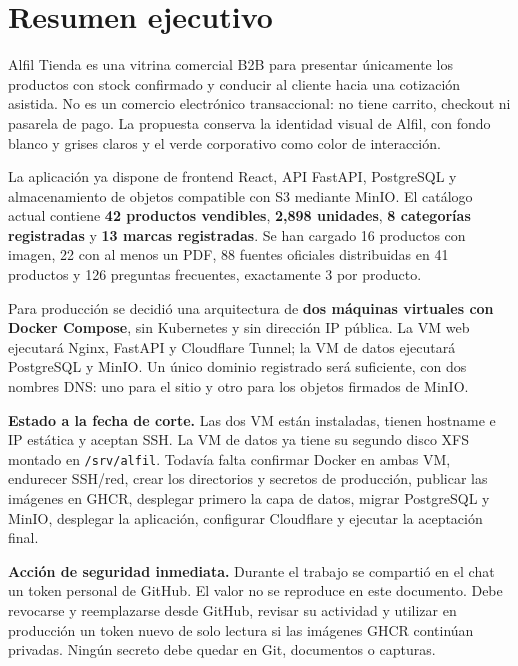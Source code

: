 \documentclass[11pt,a4paper]{article}
\newcommand{\code}[1]{\nolinkurl{#1}}
\begin{document}
\tableofcontents
\clearpage

\section{Resumen ejecutivo}

Alfil Tienda es una vitrina comercial B2B para presentar únicamente los productos con stock confirmado y conducir al cliente hacia una cotización asistida. No es un comercio electrónico transaccional: no tiene carrito, checkout ni pasarela de pago. La propuesta conserva la identidad visual de Alfil, con fondo blanco y grises claros y el verde corporativo como color de interacción.

La aplicación ya dispone de frontend React, API FastAPI, PostgreSQL y almacenamiento de objetos compatible con S3 mediante MinIO. El catálogo actual contiene \textbf{42 productos vendibles}, \textbf{2,898 unidades}, \textbf{8 categorías registradas} y \textbf{13 marcas registradas}. Se han cargado 16 productos con imagen, 22 con al menos un PDF, 88 fuentes oficiales distribuidas en 41 productos y 126 preguntas frecuentes, exactamente 3 por producto.

Para producción se decidió una arquitectura de \textbf{dos máquinas virtuales con Docker Compose}, sin Kubernetes y sin dirección IP pública. La VM web ejecutará Nginx, FastAPI y Cloudflare Tunnel; la VM de datos ejecutará PostgreSQL y MinIO. Un único dominio registrado será suficiente, con dos nombres DNS: uno para el sitio y otro para los objetos firmados de MinIO.

\begin{summarybox}
\textbf{Estado a la fecha de corte.} Las dos VM están instaladas, tienen hostname e IP estática y aceptan SSH. La VM de datos ya tiene su segundo disco XFS montado en \code{/srv/alfil}. Todavía falta confirmar Docker en ambas VM, endurecer SSH/red, crear los directorios y secretos de producción, publicar las imágenes en GHCR, desplegar primero la capa de datos, migrar PostgreSQL y MinIO, desplegar la aplicación, configurar Cloudflare y ejecutar la aceptación final.
\end{summarybox}

\begin{dangerbox}
\textbf{Acción de seguridad inmediata.} Durante el trabajo se compartió en el chat un token personal de GitHub. El valor no se reproduce en este documento. Debe revocarse y reemplazarse desde GitHub, revisar su actividad y utilizar en producción un token nuevo de solo lectura si las imágenes GHCR continúan privadas. Ningún secreto debe quedar en Git, documentos o capturas.
\end{dangerbox}
\end{document}
